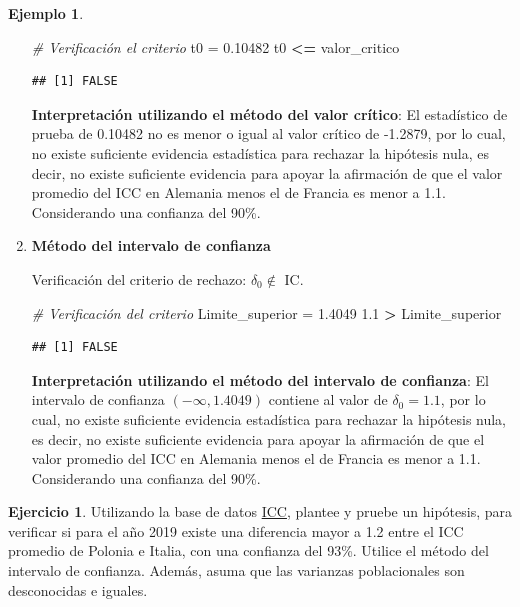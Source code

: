 \documentclass[
  11pt,
]{book}
\newenvironment{Shaded}{\begin{snugshade}}{\end{snugshade}}
\newcommand{\CommentTok}[1]{\textcolor[rgb]{0.56,0.35,0.01}{\textit{#1}}}
\newcommand{\FloatTok}[1]{\textcolor[rgb]{0.00,0.00,0.81}{#1}}
\newcommand{\NormalTok}[1]{#1}
\newcommand{\OtherTok}[1]{\textcolor[rgb]{0.56,0.35,0.01}{#1}}
\newcommand{\SpecialCharTok}[1]{\textcolor[rgb]{0.81,0.36,0.00}{\textbf{#1}}}
\theoremstyle{definition}
\theoremstyle{definition}
\newtheorem{example}{Ejemplo}[chapter]
\theoremstyle{definition}
\newtheorem{exercise}{Ejercicio}[chapter]
\theoremstyle{definition}
\theoremstyle{remark}
\begin{document}
\begin{example}
\begin{enumerate}
\begin{Shaded}
\begin{Highlighting}[]
\CommentTok{\# Verificación el criterio}
\NormalTok{t0 }\OtherTok{=} \FloatTok{0.10482}
\NormalTok{t0 }\SpecialCharTok{\textless{}=}\NormalTok{ valor\_critico}
\end{Highlighting}
\end{Shaded}

\begin{verbatim}
## [1] FALSE
\end{verbatim}

  \textbf{Interpretación utilizando el método del valor crítico}: El estadístico de prueba de 0.10482 no es menor o igual al valor crítico de -1.2879, por lo cual, no existe suficiente evidencia estadística para rechazar la hipótesis nula, es decir, no existe suficiente evidencia para apoyar la afirmación de que el valor promedio del ICC en Alemania menos el de Francia es menor a 1.1. Considerando una confianza del 90\%.
\item
  \textbf{Método del intervalo de confianza}

  Verificación del criterio de rechazo: \(\delta_0 \notin\) IC.

\begin{Shaded}
\begin{Highlighting}[]
\CommentTok{\# Verificación del criterio}
\NormalTok{Limite\_superior }\OtherTok{=} \FloatTok{1.4049}
\FloatTok{1.1} \SpecialCharTok{\textgreater{}}\NormalTok{ Limite\_superior}
\end{Highlighting}
\end{Shaded}

\begin{verbatim}
## [1] FALSE
\end{verbatim}

  \textbf{Interpretación utilizando el método del intervalo de confianza}: El intervalo de confianza \((-\infty, 1.4049)\) contiene al valor de \(\delta_0 = 1.1\), por lo cual, no existe suficiente evidencia estadística para rechazar la hipótesis nula, es decir, no existe suficiente evidencia para apoyar la afirmación de que el valor promedio del ICC en Alemania menos el de Francia es menor a 1.1. Considerando una confianza del 90\%.
\end{enumerate}

\end{example}

\begin{exercise}
Utilizando la base de datos \hyperref[ICC]{ICC}, plantee y pruebe un hipótesis, para verificar si para el año 2019 existe una diferencia mayor a 1.2 entre el ICC promedio de Polonia e Italia, con una confianza del 93\%. Utilice el método del intervalo de confianza. Además, asuma que las varianzas poblacionales son desconocidas e iguales.
\end{exercise}
\end{document}
